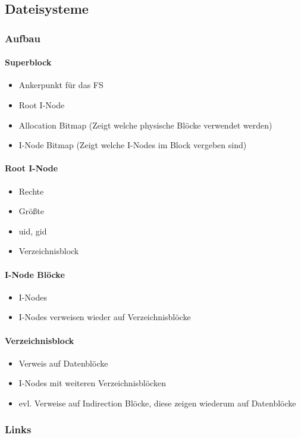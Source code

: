 \documentclass[12pt,a4paper]{article}
\begin{document}
\subsection{Dateisysteme}
\subsubsection{Aufbau}
\paragraph{Superblock}
\flushleft
\begin{itemize}
\item Ankerpunkt für das FS
\item Root I-Node
\item Allocation Bitmap (Zeigt welche physische Blöcke verwendet werden)
\item I-Node Bitmap (Zeigt welche I-Nodes im Block vergeben sind)
\end{itemize}
\paragraph{Root I-Node}
\flushleft
\begin{itemize}
\item Rechte
\item Größte
\item uid, gid
\item Verzeichnisblock
\end{itemize}
\paragraph{I-Node Blöcke}
\flushleft
\begin{itemize}
\item I-Nodes
\item I-Nodes verweisen wieder auf Verzeichnisblöcke
\end{itemize}
\paragraph{Verzeichnisblock}
\flushleft
\begin{itemize}
\item Verweis auf Datenblöcke
\item I-Nodes mit weiteren Verzeichnisblöcken
\item evl. Verweise auf Indirection Blöcke, diese zeigen wiederum auf Datenblöcke
\end{itemize}
\subsubsection{Links}
\end{document}
